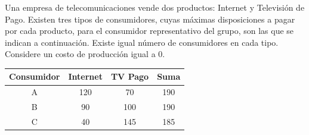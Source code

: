 \question Una empresa de telecomunicaciones vende dos productos: Internet y Televisión de Pago. Existen tres tipos de consumidores, cuyas máximas disposiciones a pagar por cada producto, para el consumidor representativo del grupo, son las que se indican a continuación. Existe igual número de consumidores en cada tipo. Considere un costo de producción igual a 0.
\begin{center}
\begin{tabular}{cccc}
  Consumidor & Internet & TV Pago & Suma \\ \hline
  A & 120 & 70 & 190 \\
  B & 90 & 100 & 190 \\
  C & 40 & 145 & 185
\end{tabular}
\end{center}
